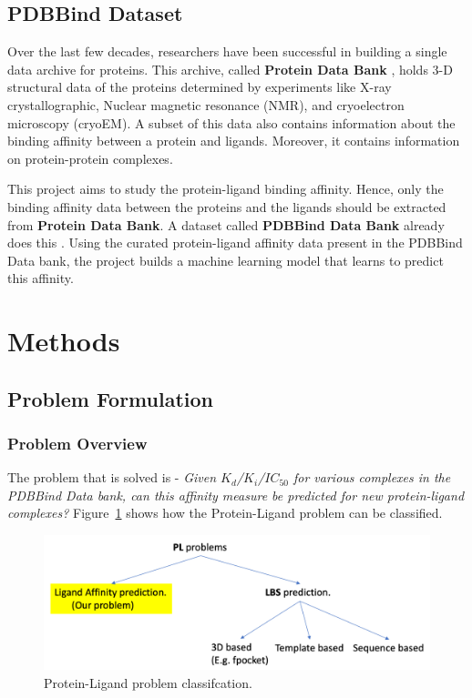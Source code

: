 \documentclass[11pt]{article}
\begin{document}
\subsection{PDBBind Dataset}
Over the last few decades, researchers have been successful in building a single data archive for proteins. This archive, called \textbf{Protein Data Bank} \cite{pdb_homepage}, holds 3-D structural data of the proteins determined by experiments like X-ray crystallographic, Nuclear magnetic resonance (NMR), and cryoelectron microscopy (cryoEM).  A subset of this data also contains information about the binding affinity between a protein and ligands. Moreover, it contains information on protein-protein complexes.
\cite{pdbank_history}

This project aims to study the protein-ligand binding affinity. Hence, only the binding affinity data between the proteins and the ligands should be extracted from \textbf{Protein Data Bank}.  A dataset called \textbf{PDBBind Data Bank} already does this
\cite{pdbbind_introduction}.
Using the curated protein-ligand affinity data present in the PDBBind Data bank, the project builds a machine learning model that learns to predict this affinity.

\section{Methods}
\subsection{Problem Formulation}
\subsubsection{Problem Overview}
\label{ProblemOverviewlabel}
The problem that is solved is - \textit{Given $K_d$/$K_i$/$IC_{50}$ for various complexes in the PDBBind Data bank,
can this affinity measure be predicted for new protein-ligand complexes?}
Figure~\ref{fig:plproblemclassification} shows how the Protein-Ligand problem can be classified.

\begin{figure}[htb]
  \centering
    \includegraphics[scale=0.35]{images/pl_problem_classification}
    \caption{Protein-Ligand problem classifcation.}
    \label{fig:plproblemclassification}
\end{figure}
\end{document}
